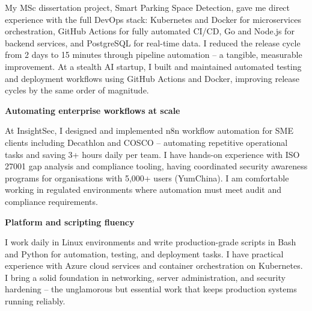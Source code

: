 \documentclass{coverletter}
\begin{document}
\vspace{0.12cm}

\noindent%
{\color{secondary}\sffamily\small
  My MSc dissertation project, Smart Parking Space Detection, gave me direct experience with the full DevOps stack: Kubernetes and Docker for microservices orchestration, GitHub Actions for fully automated CI/CD, Go and Node.js for backend services, and PostgreSQL for real-time data. I reduced the release cycle from 2 days to 15 minutes through pipeline automation -- a tangible, measurable improvement. At a stealth AI startup, I built and maintained automated testing and deployment workflows using GitHub Actions and Docker, improving release cycles by the same order of magnitude.
}

\vspace{0.30cm}

\noindent%
{\color{secondary}\sffamily\small\bfseries
  Automating enterprise workflows at scale
}

\vspace{0.12cm}

\noindent%
{\color{secondary}\sffamily\small
  At InsightSec, I designed and implemented n8n workflow automation for SME clients including Decathlon and COSCO -- automating repetitive operational tasks and saving 3+ hours daily per team. I have hands-on experience with ISO 27001 gap analysis and compliance tooling, having coordinated security awareness programs for organisations with 5,000+ users (YumChina). I am comfortable working in regulated environments where automation must meet audit and compliance requirements.
}

\vspace{0.30cm}

\noindent%
{\color{secondary}\sffamily\small\bfseries
  Platform and scripting fluency
}

\vspace{0.12cm}

\noindent%
{\color{secondary}\sffamily\small
  I work daily in Linux environments and write production-grade scripts in Bash and Python for automation, testing, and deployment tasks. I have practical experience with Azure cloud services and container orchestration on Kubernetes. I bring a solid foundation in networking, server administration, and security hardening -- the unglamorous but essential work that keeps production systems running reliably.
}
\end{document}
